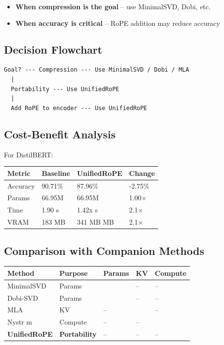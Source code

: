 \begin{itemize}
\item \textbf{When compression is the goal} -- use MinimalSVD, Dobi, etc.
\item \textbf{When accuracy is critical} -- RoPE addition may reduce accuracy

\end{itemize}
\subsection{Decision Flowchart}

\begin{lstlisting}
Goal? --- Compression --- Use MinimalSVD / Dobi / MLA
  |
  Portability --- Use UnifiedRoPE
  |
  Add RoPE to encoder --- Use UnifiedRoPE
\end{lstlisting}

\subsection{Cost-Benefit Analysis}

For DistilBERT:

\begin{table}[H]
\centering
\small
\begin{tabular}{llll}
\toprule
\textbf{Metric} & \textbf{Baseline} & \textbf{UnifiedRoPE} & \textbf{Change} \\
\midrule
Accuracy & 90.71\% & 87.96\% & -2.75\% \\
Params & 66.95M & 66.95M & 1.00$\times$ \\
Time & 1.90 s & 1.42x s & 2.1$\times$ \\
VRAM & 183 MB & 341 MB MB & 2.1$\times$ \\
\bottomrule
\end{tabular}
\end{table}

\subsection{Comparison with Companion Methods}

\begin{table}[H]
\centering
\small
\begin{tabular}{lllll}
\toprule
\textbf{Method} & \textbf{Purpose} & \textbf{Params} & \textbf{KV} & \textbf{Compute} \\
\midrule
MinimalSVD & Params &  & -- & -- \\
Dobi-SVD & Params &  & -- & -- \\
MLA & KV & -- &  & -- \\
Nystr m & Compute & -- & -- &  \\
\textbf{UnifiedRoPE} & \textbf{Portability} & -- & -- & -- \\
\bottomrule
\end{tabular}
\end{table}

